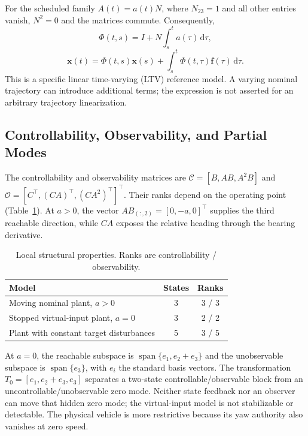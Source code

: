 For the scheduled family $A(t)=a(t)N$, where $N_{23}=1$ and all other entries vanish, $N^2=0$ and the matrices commute. Consequently,
\begin{equation}
\Phi(t,s)=I+N\int_s^t a(\tau)\,\mathrm d\tau,
\end{equation}
\begin{equation}
\mathbf x(t)=\Phi(t,s)\mathbf x(s)+\int_s^t\Phi(t,\tau)\mathbf f(\tau)\,\mathrm d\tau.
\end{equation}
This is a specific linear time-varying (LTV) reference model. A varying nominal trajectory can introduce additional terms; the expression is not asserted for an arbitrary trajectory linearization.

\subsection{Controllability, Observability, and Partial Modes}
The controllability and observability matrices are $\mathcal C=[B,AB,A^2B]$ and $\mathcal O=[C^\top,(CA)^\top,(CA^2)^\top]^\top$. Their ranks depend on the operating point (Table~\ref{tab:ranks}). At $a>0$, the vector $AB_{(:,2)}=[0,-a,0]^\top$ supplies the third reachable direction, while $CA$ exposes the relative heading through the bearing derivative.

\begin{table}[t]
\caption{Local structural properties. Ranks are controllability / observability.}
\label{tab:ranks}\centering\footnotesize
\begin{tabularx}{\columnwidth}{@{}Xcc@{}}\toprule
Model & States & Ranks\\\midrule
Moving nominal plant, $a>0$ & 3 & 3 / 3\\
Stopped virtual-input plant, $a=0$ & 3 & 2 / 2\\
Plant with constant target disturbances & 5 & 3 / 5\\\bottomrule
\end{tabularx}
\end{table}

At $a=0$, the reachable subspace is $\operatorname{span}\{e_1,e_2+e_3\}$ and the unobservable subspace is $\operatorname{span}\{e_3\}$, with $e_i$ the standard basis vectors. The transformation $T_0=[e_1,e_2+e_3,e_3]$ separates a two-state controllable/observable block from an uncontrollable/unobservable zero mode. Neither state feedback nor an observer can move that hidden zero mode; the virtual-input model is not stabilizable or detectable. The physical vehicle is more restrictive because its yaw authority also vanishes at zero speed.

